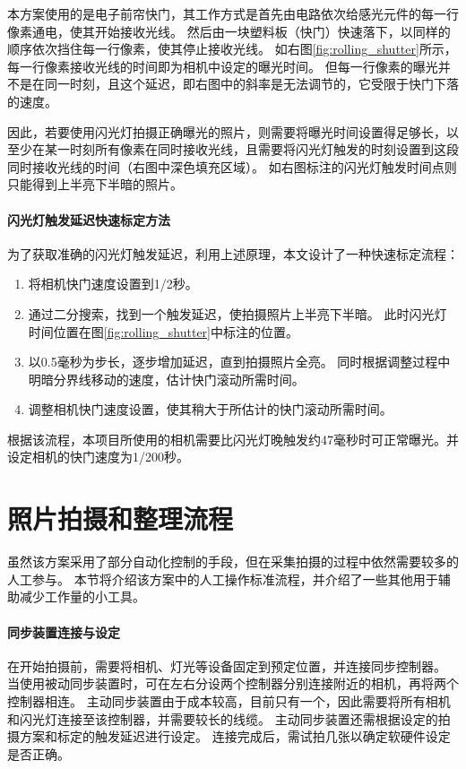 本方案使用的是电子前帘快门，其工作方式是首先由电路依次给感光元件的每一行像素通电，使其开始接收光线。
然后由一块塑料板（快门）快速落下，以同样的顺序依次挡住每一行像素，使其停止接收光线。
如右图\ref{fig:rolling_shutter}所示，每一行像素接收光线的时间即为相机中设定的曝光时间。
但每一行像素的曝光并不是在同一时刻，且这个延迟，即右图中的斜率是无法调节的，它受限于快门下落的速度。


因此，若要使用闪光灯拍摄正确曝光的照片，则需要将曝光时间设置得足够长，以至少在某一时刻所有像素在同时接收光线，且需要将闪光灯触发的时刻设置到这段同时接收光线的时间（右图中深色填充区域）。
如右图标注的闪光灯触发时间点则只能得到上半亮下半暗的照片。

\paragraph{闪光灯触发延迟快速标定方法}
为了获取准确的闪光灯触发延迟，利用上述原理，本文设计了一种快速标定流程：
\begin{enumerate}
\item 将相机快门速度设置到1/2秒。
\item 通过二分搜索，找到一个触发延迟，使拍摄照片上半亮下半暗。
此时闪光灯时间位置在图\ref{fig:rolling_shutter}中标注的位置。
\item 以0.5毫秒为步长，逐步增加延迟，直到拍摄照片全亮。
同时根据调整过程中明暗分界线移动的速度，估计快门滚动所需时间。
\item 调整相机快门速度设置，使其稍大于所估计的快门滚动所需时间。
\end{enumerate}
根据该流程，本项目所使用的相机需要比闪光灯晚触发约47毫秒时可正常曝光。并设定相机的快门速度为1/200秒。

\section{照片拍摄和整理流程}

虽然该方案采用了部分自动化控制的手段，但在采集拍摄的过程中依然需要较多的人工参与。
本节将介绍该方案中的人工操作标准流程，并介绍了一些其他用于辅助减少工作量的小工具。

\paragraph{同步装置连接与设定}
在开始拍摄前，需要将相机、灯光等设备固定到预定位置，并连接同步控制器。
当使用被动同步装置时，可在左右分设两个控制器分别连接附近的相机，再将两个控制器相连。
主动同步装置由于成本较高，目前只有一个，因此需要将所有相机和闪光灯连接至该控制器，并需要较长的线缆。
主动同步装置还需根据设定的拍摄方案和标定的触发延迟进行设定。
连接完成后，需试拍几张以确定软硬件设定是否正确。

